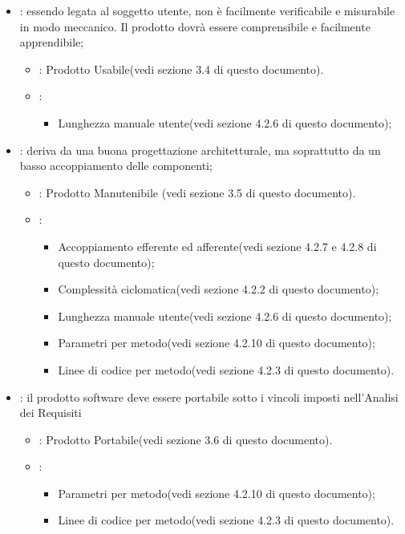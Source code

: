 \begin{itemize}
\item {}: essendo legata al soggetto utente, non è facilmente verificabile e misurabile in modo meccanico. Il prodotto dovrà essere comprensibile e facilmente apprendibile;
\begin{itemize}
\item {}: Prodotto Usabile(vedi sezione 3.4 di questo documento).
\item {}:
\begin{itemize}
\item Lunghezza manuale utente(vedi sezione 4.2.6 di questo documento);
\end{itemize} 
\end{itemize}
\item {}: deriva da una buona progettazione architetturale, ma soprattutto da un basso accoppiamento delle componenti;
\begin{itemize}
\item {}: Prodotto Manutenibile (vedi sezione 3.5 di questo documento).
\item {}:
\begin{itemize}
\item Accoppiamento efferente ed afferente(vedi sezione 4.2.7 e 4.2.8 di questo documento);
\item Complessità ciclomatica(vedi sezione 4.2.2 di questo documento);
\item Lunghezza manuale utente(vedi sezione 4.2.6 di questo documento);
\item Parametri per metodo(vedi sezione 4.2.10 di questo documento);
\item Linee di codice per metodo(vedi sezione 4.2.3 di questo documento).
\end{itemize}
\end{itemize}
\item {}: il prodotto software deve essere portabile sotto i vincoli imposti nell'Analisi dei Requisiti
\begin{itemize}
\item {}: Prodotto Portabile(vedi sezione 3.6 di questo documento).
\item {}:
\begin{itemize}
\item Parametri per metodo(vedi sezione 4.2.10 di questo documento);
\item Linee di codice per metodo(vedi sezione 4.2.3 di questo documento).
\end{itemize}
\end{itemize}
\end{itemize} 

